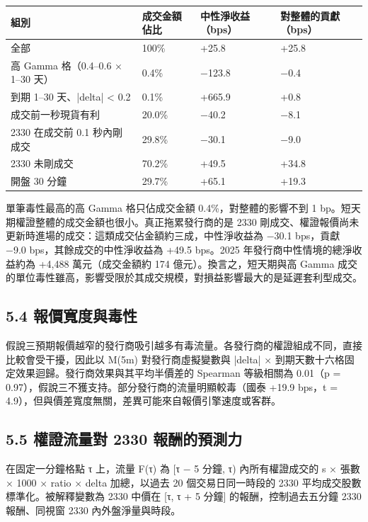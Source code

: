 \documentclass[12pt,a4paper]{article}
\begin{document}
\begin{center}\small
\begin{tabularx}{\linewidth}{Ylll}
\toprule
\textbf{組別} & \textbf{成交金額佔比} & \textbf{中性淨收益（bps）} & \textbf{對整體的貢獻（bps）} \\
\midrule
全部 & 100\% & +25.8 & +25.8 \\
高 Gamma 格（0.4–0.6 × 1–30 天） & 0.4\% & −123.8 & −0.4 \\
到期 1–30 天、|delta| < 0.2 & 0.1\% & +665.9 & +0.8 \\
成交前一秒現貨有利 & 20.0\% & −40.2 & −8.1 \\
2330 在成交前 0.1 秒內剛成交 & 29.8\% & −30.1 & −9.0 \\
2330 未剛成交 & 70.2\% & +49.5 & +34.8 \\
開盤 30 分鐘 & 29.7\% & +65.1 & +19.3 \\
\bottomrule
\end{tabularx}
\end{center}

單筆毒性最高的高 Gamma 格只佔成交金額 0.4\%，對整體的影響不到 1 bp。短天期權證整體的成交金額也很小。真正拖累發行商的是 2330 剛成交、權證報價尚未更新時進場的成交：這類成交佔金額約三成，中性淨收益為 −30.1 bps，貢獻 −9.0 bps，其餘成交的中性淨收益為 +49.5 bps。2025 年發行商中性情境的總淨收益約為 +4,488 萬元（成交金額約 174 億元）。換言之，短天期與高 Gamma 成交的單位毒性雖高，影響受限於其成交規模，對損益影響最大的是延遲套利型成交。

\subsection*{5.4 報價寬度與毒性}

假說三預期報價越窄的發行商吸引越多有毒流量。各發行商的權證組成不同，直接比較會受干擾，因此以 M(5m) 對發行商虛擬變數與 |delta| × 到期天數十六格固定效果迴歸。發行商效果與其平均半價差的 Spearman 等級相關為 0.01（p = 0.97），假說三不獲支持。部分發行商的流量明顯較毒（國泰 +19.9 bps，t = 4.9），但與價差寬度無關，差異可能來自報價引擎速度或客群。

\subsection*{5.5 權證流量對 2330 報酬的預測力}

在固定一分鐘格點 τ 上，流量 F(τ) 為 [τ − 5 分鐘, τ) 內所有權證成交的 s × 張數 × 1000 × ratio × delta 加總，以過去 20 個交易日同一時段的 2330 平均成交股數標準化。被解釋變數為 2330 中價在 [τ, τ + 5 分鐘] 的報酬，控制過去五分鐘 2330 報酬、同視窗 2330 內外盤淨量與時段。
\end{document}
